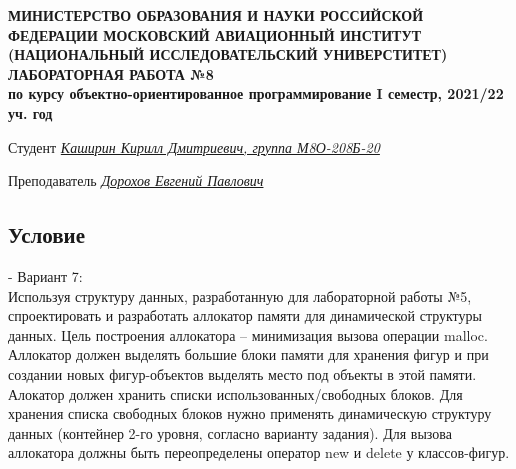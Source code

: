 \documentclass[12pt]{article}
\begin{document}
\begin{titlepage}
\begin{center}
\textbf{МИНИСТЕРСТВО ОБРАЗОВАНИЯ И НАУКИ РОССИЙСКОЙ ФЕДЕРАЦИИ
\medskip
МОСКОВСКИЙ АВИАЦИОННЫЙ ИНСТИТУТ
(НАЦИОНАЛЬНЫЙ ИССЛЕДОВАТЕЛЬСКИЙ УНИВЕРСТИТЕТ)
\vfill\vfill
{\Huge ЛАБОРАТОРНАЯ РАБОТА №8} \\
по курсу объектно-ориентированное программирование
I семестр, 2021/22 уч. год}
\end{center}
\vfill

Студент \uline{\it {Каширин Кирилл Дмитриевич, группа М8О-208Б-20}\hfill}

Преподаватель \uline{\it {Дорохов Евгений Павлович}\hfill}

\vfill
\end{titlepage}

\subsection*{Условие}
 - Вариант 7:\\
Используя структуру данных, разработанную для лабораторной работы №5, спроектировать и 
разработать аллокатор памяти для динамической структуры данных.
Цель построения аллокатора – минимизация вызова операции malloc. Аллокатор должен 
выделять большие блоки памяти для хранения фигур и при создании новых фигур-объектов 
выделять место под объекты в этой памяти.
Алокатор должен хранить списки использованных/свободных блоков. Для хранения списка 
свободных блоков нужно применять динамическую структуру данных (контейнер 2-го уровня, 
согласно варианту задания).
Для вызова аллокатора должны быть переопределены оператор new и delete у классов-фигур.
\end{document}
